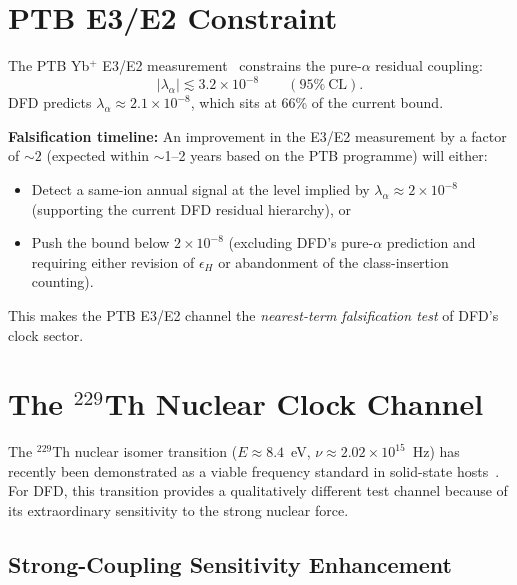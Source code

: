 \documentclass[twocolumn,showpacs,preprintnumbers,amsmath,amssymb,prd]{revtex4-2}
\begin{document}
\section{PTB E3/E2 Constraint}\label{sec:ptb}

The PTB Yb$^+$ E3/E2 measurement~\cite{Lange2021} constrains the
pure-$\alpha$ residual coupling:
\begin{equation}\label{eq:ptb-bound}
|\lambda_\alpha| \lesssim 3.2 \times 10^{-8}
\qquad (95\%~\text{CL}).
\end{equation}
DFD predicts $\lambda_\alpha \approx 2.1 \times 10^{-8}$, which
sits at 66\% of the current bound.

\textbf{Falsification timeline:} An improvement in the E3/E2
measurement by a factor of $\sim 2$ (expected within $\sim$1--2
years based on the PTB programme) will either:
\begin{itemize}
\item Detect a same-ion annual signal at the level implied by
  $\lambda_\alpha \approx 2 \times 10^{-8}$ (supporting the current
  DFD residual hierarchy), or
\item Push the bound below $2 \times 10^{-8}$ (excluding DFD's
  pure-$\alpha$ prediction and requiring either revision of
  $\epsilon_H$ or abandonment of the class-insertion counting).
\end{itemize}

This makes the PTB E3/E2 channel the \emph{nearest-term
falsification test} of DFD's clock sector.

\section{The $^{229}$Th Nuclear Clock Channel}\label{sec:nuclear}

The $^{229}$Th nuclear isomer transition ($E \approx 8.4$~eV,
$\nu \approx 2.02 \times 10^{15}$~Hz) has recently been demonstrated
as a viable frequency standard in solid-state
hosts~\cite{Ooi2026,Beeks2025}.  For DFD, this transition provides
a qualitatively different test channel because of its extraordinary
sensitivity to the strong nuclear force.

\subsection{Strong-Coupling Sensitivity Enhancement}
\end{document}
